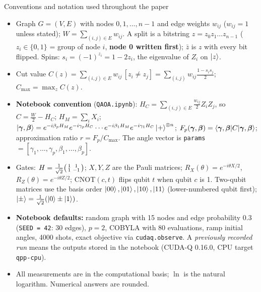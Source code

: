 \documentclass[11pt,a4paper]{article}
\begin{document}
\begin{infobox}{Conventions and notation used throughout the paper}
\small
\begin{itemize}[leftmargin=1.2em, itemsep=1pt, topsep=2pt]
\item Graph $G = (V, E)$ with nodes $0, 1, \dots, n-1$ and edge weights $w_{ij}$ ($w_{ij} = 1$ unless stated); $W = \sum_{(i,j)\in E} w_{ij}$.
      A split is a bitstring $z = z_0z_1\dots z_{n-1}$ ($z_i \in \{0,1\}$ = group of node $i$, \textbf{node 0 written first});
      $\bar z$ is $z$ with every bit flipped. Spins: $s_i = (-1)^{z_i} = 1 - 2z_i$, the eigenvalue of $Z_i$ on $\ket z$.
\item Cut value $C(z) = \sum_{(i,j)\in E} w_{ij}\,[z_i \neq z_j] = \sum_{(i,j)} w_{ij}\frac{1 - s_is_j}{2}$; $C_{\max} = \max_z C(z)$.
\item \textbf{Notebook convention} (\texttt{QAOA.ipynb}): $H_C = \sum_{(i,j)\in E}\frac{w_{ij}}{2}Z_iZ_j$, so $C = \frac W2 - H_C$;
      $H_M = \sum_i X_i$; $\ket{\boldsymbol\gamma,\boldsymbol\beta} = e^{-i\beta_pH_M}e^{-i\gamma_pH_C}\cdots e^{-i\beta_1H_M}e^{-i\gamma_1H_C}\ket{+}^{\otimes n}$;
      $F_p(\boldsymbol\gamma,\boldsymbol\beta) = \braket{\boldsymbol\gamma,\boldsymbol\beta|C|\boldsymbol\gamma,\boldsymbol\beta}$; approximation ratio $r = F_p/C_{\max}$.
      The angle vector is \texttt{params} $= [\gamma_1, \dots, \gamma_p, \beta_1, \dots, \beta_p]$.
\item Gates: $H = \frac{1}{\sqrt2}\begin{psmallmatrix}1&1\\1&-1\end{psmallmatrix}$; $X, Y, Z$ are the Pauli matrices; $R_X(\theta) = e^{-i\theta X/2}$,
      $R_Z(\theta) = e^{-i\theta Z/2}$; CNOT$(c, t)$ flips qubit $t$ when qubit $c$ is 1. Two-qubit matrices use the basis order
      $\ket{00}, \ket{01}, \ket{10}, \ket{11}$ (lower-numbered qubit first); $\ket{\pm} = \frac{1}{\sqrt2}(\ket0 \pm \ket1)$.
\item \textbf{Notebook defaults:} random graph with 15 nodes and edge probability $0.3$ (\texttt{SEED = 42}: 30 edges), $p = 2$, COBYLA with
      80 evaluations, ramp initial angles, 4000 shots, exact objective via \texttt{cudaq.observe}. A \emph{previously recorded run} means the
      outputs stored in the notebook (CUDA-Q 0.16.0, CPU target \texttt{qpp-cpu}).
\item All measurements are in the computational basis; $\ln$ is the natural logarithm. Numerical answers are rounded.
\end{itemize}
\end{infobox}
\newpage
\end{document}
